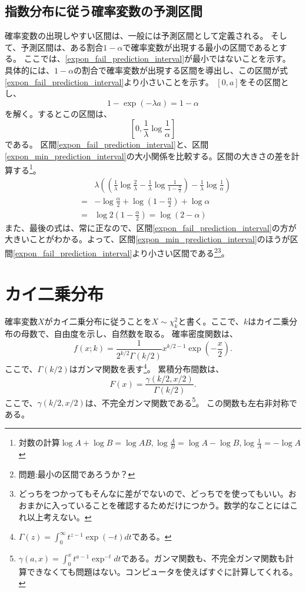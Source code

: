 \subsection{指数分布に従う確率変数の予測区間}
確率変数の出現しやすい区間は、一般には予測区間として定義される。
そして、予測区間は、ある割合$1-\alpha$で確率変数が出現する最小の区間であるとする。
ここでは、\ref{expon_fail_prediction_interval}が最小ではないことを示す。
具体的には、$1-\alpha$の割合で確率変数が出現する区間を導出し、この区間が式\ref{expon_fail_prediction_interval}より小さいことを示す。
$[0,a]$をその区間とし、
\begin{equation*}
 1-\exp(-\lambda a) = 1-\alpha
\end{equation*}
を解く。するとこの区間は、
\begin{equation*}\label{expon_min_prediction_interval}
[0,\frac{1}{\lambda}\log\frac{1}{\alpha}]
 \end{equation*}
である。
区間\ref{expon_fail_prediction_interval}と、区間\ref{expon_min_prediction_interval}の大小関係を比較する。区間の大きさの差を計算する\footnote{対数の計算$\log A+\log B=\log AB,\log \frac{A}{B}= \log A-\log B$,$\log \frac{1}{A}=-\log A$}。
\begin{eqnarray*}
 & &\lambda \left( (\frac{1}{\lambda}\log\frac{2}{\lambda}-\frac{1}{\lambda}\log\frac{1}{1-\frac{\alpha}{2}})-\frac{1}{\lambda}\log\frac{1}{\alpha} \right)\\
&=& -\log\frac{\alpha}{2}+\log(1-\frac{\alpha}{2})+\log\alpha \\
&=& \log2(1-\frac{\alpha}{2}) = \log(2-\alpha)
\end{eqnarray*}
また、最後の式は、常に正なので、区間\ref{expon_fail_prediction_interval}の方が大きいことがわかる。よって、区間\ref{expon_min_prediction_interval}のほうが区間\ref{expon_fail_prediction_interval}より小さい区間である\footnote{問題:最小の区間であろうか？}\footnote{どっちをつかってもそんなに差がでないので、どっちでを使ってもいい。おおまかに入っていることを確認するためだけにつかう。数学的なことにはこれ以上考えない。}。


\section{カイ二乗分布}
確率変数$X$がカイ二乗分布に従うことを$X \sim \chi^2_k$と書く。ここで、$k$はカイ二乗分布の母数で、自由度を示し、自然数を取る。
確率密度関数は、
\begin{equation*}
    f(x;k) = \frac{1}{2^{k/2}\Gamma(k/2)}x^{k/2-1}\exp\left(-\frac{x}{2}\right).
\end{equation*}
ここで、$\Gamma(k/2)$はガンマ関数を表す\footnote{$ \Gamma(z)=\int_0^{\infty }t^{z-1}\exp(-t)dt$である。 }。
累積分布間数は、
\begin{equation*}
    F(x) = \frac{\gamma(k/2,x/2)}{\Gamma(k/2)}.
\end{equation*}
ここで、$\gamma(k/2,x/2)$は、不完全ガンマ関数である\footnote{$\gamma(a,x)=\int_0^x t^{a-1}\exp^{-t}dt$である。ガンマ関数も、不完全ガンマ関数も計算できなくても問題はない。コンピュータを使えばすぐに計算してくれる。}。
この関数も左右非対称である。


